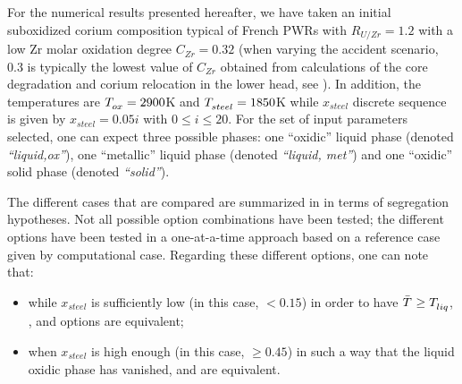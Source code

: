 For the numerical results presented hereafter, we have taken an initial suboxidized corium composition typical of French PWRs with $R_{U/Zr}=1.2$ with a low Zr molar oxidation degree $C_{Zr}=0.32$ (when varying the accident scenario, 0.3 is typically the lowest value of $C_{Zr}$ obtained from calculations of the core degradation and corium relocation in the lower head, see \cite{Seiler2014}). In addition, the temperatures are $\temperature{ox}=2900$K and $\temperature{steel}=1850$K while $x_{steel}$ discrete sequence is given by $x_{steel} = 0.05i$ with $0 \le i \le 20$. For the set of input parameters selected, one can expect three possible phases: one ``oxidic'' liquid phase (denoted \textit{``liquid,ox''}), one ``metallic'' liquid phase (denoted \textit{``liquid, met''}) and one ``oxidic'' solid phase (denoted \textit{``solid''}).

The different cases that are compared are summarized in  in terms of segregation hypotheses. Not all possible option combinations have been tested; the different options have been tested in a one-at-a-time approach based on a reference case given by  computational case. Regarding these different options, one can note that:
\begin{itemize}
 \item while $x_{steel}$ is sufficiently low (in this case, $< 0.15$) in order to have $\bar{\temperature{}} \ge \temperature{liq}$, ,  and  options are equivalent;
 \item when $x_{steel}$ is high enough (in this case, $\ge 0.45$) in such a way that the liquid oxidic phase has vanished,  and  are equivalent.
\end{itemize}

